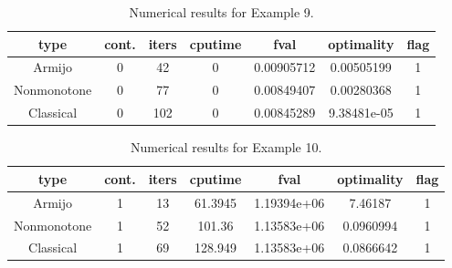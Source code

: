 \documentclass[a4paper]{article}
\newcommand{\mr}{\mathbb{R}}
\newcommand{\co}[1]{{\con{#1}}}
\begin{document}


\begin{table}[p]
  \centering
  \begin{tabular}{cc|ccccc}
    \hline
    type & cont. & iters & cputime & 
    fval & optimality & flag \\ \hline
    Armijo & 0 & 42 & 0 & 0.00905712 & 0.00505199 & 1 \\
    Nonmonotone & 0 & 77 & 0 & 0.00849407 & 0.00280368 & 1 \\
    Classical & 0 & 102 & 0 & 0.00845289 & 9.38481e-05 & 1 \\
    \hline
  \end{tabular}
  \caption{Numerical results for Example 9.}
  \label{tab9}
\end{table}




\begin{table}[p]
  \centering
  \begin{tabular}{cc|ccccc}
    \hline
    type & cont. & iters & cputime & 
    fval & optimality & flag \\ \hline
    Armijo & 1 & 13 & 61.3945 & 1.19394e+06 & 7.46187 & 1 \\
    Nonmonotone & 1 & 52 & 101.36 & 1.13583e+06 & 0.0960994 & 1 \\
    Classical & 1 & 69 & 128.949 & 1.13583e+06 & 0.0866642 & 1 \\
    \hline
  \end{tabular}
  \caption{Numerical results for Example 10.}
  \label{tab10}
\end{table}
  
\end{document}

